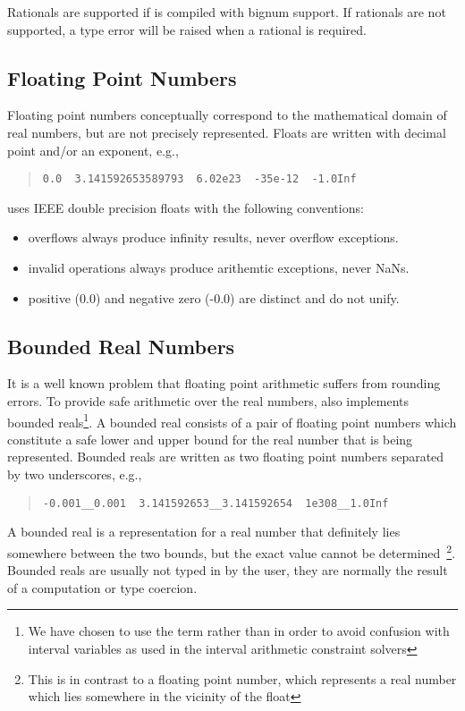 Rationals are supported if {\eclipse} is compiled with bignum support.
If rationals are not supported, a type error will be raised when a rational is
required.

\subsection{Floating Point Numbers}
Floating point numbers conceptually correspond to the mathematical
domain of real numbers, but are not precisely represented.
Floats are written with decimal point and/or an exponent, e.g.,
\begin{quote}
\begin{verbatim}
0.0  3.141592653589793  6.02e23  -35e-12  -1.0Inf
\end{verbatim}
\end{quote}
{\eclipse} uses IEEE double precision floats with the following conventions:
\begin{itemize}
\item overflows always produce infinity results, never overflow exceptions.
\item invalid operations always produce arithemtic exceptions, never NaNs.
\item positive (0.0) and negative zero (-0.0) are distinct and do not unify.
\end{itemize}


\subsection{Bounded Real Numbers}
It is a well known problem that floating point arithmetic suffers
from rounding errors.
To provide safe arithmetic over the real numbers, {\eclipse}
also implements bounded reals\footnote{%
  We have chosen to use the term  rather than
   in order to avoid confusion with interval variables
  as used in the interval arithmetic constraint solvers}.
A bounded real consists of a pair of floating point numbers
which constitute a safe lower and upper bound for the real number that
is being represented. Bounded reals are written as two floating point
numbers separated by two underscores, e.g.,
\begin{quote}
\begin{verbatim}
-0.001__0.001  3.141592653__3.141592654  1e308__1.0Inf
\end{verbatim}
\end{quote}
A bounded real is a representation for a real number that definitely lies
somewhere between the two bounds, but the exact value cannot be determined\
\footnote{%
  This is in contrast to a floating point number, which represents
  a real number which lies somewhere in the vicinity of the float}.
Bounded reals are usually not typed in by the user, they are normally
the result of a computation or type coercion.

